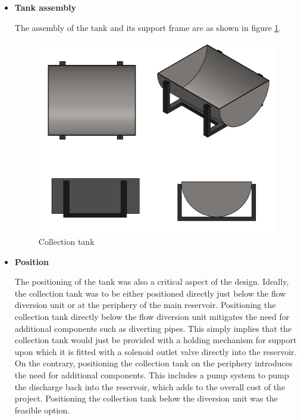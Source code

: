 \begin{itemize}
\par
\item \textbf{Tank assembly}
\par
The assembly of the tank and its support frame are as shown in figure \ref{fig:collection_tank}.
\begin{figure}[H]
    \centering
    \includegraphics{Figures/CollectionTank.PNG}
    \caption{Collection tank}
    \label{fig:collection_tank}
\end{figure}
\par
\item \textbf{Position}
\par
The positioning of the tank was also a critical aspect of the design. Ideally, the collection tank was to be either positioned directly just below the flow diversion unit or at the periphery of the main reservoir. Positioning the collection tank directly below the flow diversion unit mitigates the need for additional components such as diverting pipes. This simply implies that the collection tank would just be provided with a holding mechanism for support upon which it is fitted with a solenoid outlet valve directly into the reservoir. On the contrary, positioning the collection tank on the periphery introduces the need for additional components. This includes a pump system to pump the discharge back into the reservoir, which adds to the overall cost of the project. Positioning the collection tank below the diversion unit was the feasible option.
\end{itemize}

